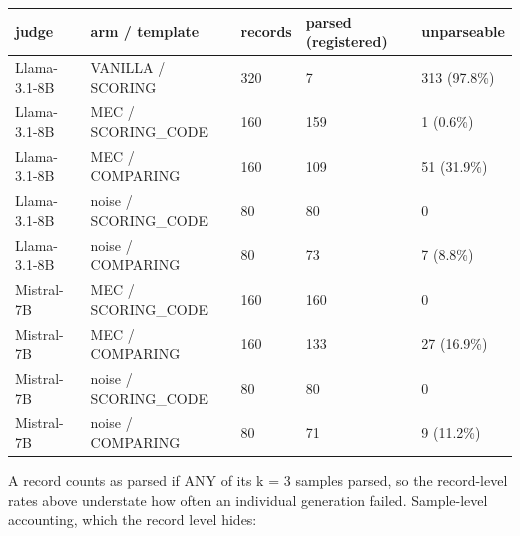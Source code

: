 {\def\LTcaptype{none} %
\begin{longtable}[]{@{}lllll@{}}
\toprule\noalign{}
judge & arm / template & records & parsed (registered) & unparseable \\
\midrule\noalign{}
\endhead
\bottomrule\noalign{}
\endlastfoot
Llama-3.1-8B & VANILLA / SCORING & 320 & 7 & 313 (97.8\%) \\
Llama-3.1-8B & MEC / SCORING\_CODE & 160 & 159 & 1 (0.6\%) \\
Llama-3.1-8B & MEC / COMPARING & 160 & 109 & 51 (31.9\%) \\
Llama-3.1-8B & noise / SCORING\_CODE & 80 & 80 & 0 \\
Llama-3.1-8B & noise / COMPARING & 80 & 73 & 7 (8.8\%) \\
Mistral-7B & MEC / SCORING\_CODE & 160 & 160 & 0 \\
Mistral-7B & MEC / COMPARING & 160 & 133 & 27 (16.9\%) \\
Mistral-7B & noise / SCORING\_CODE & 80 & 80 & 0 \\
Mistral-7B & noise / COMPARING & 80 & 71 & 9 (11.2\%) \\
\end{longtable}
}

A record counts as parsed if ANY of its k = 3 samples parsed, so the record-level rates above
understate how often an individual generation failed. Sample-level accounting, which the record
level hides:

